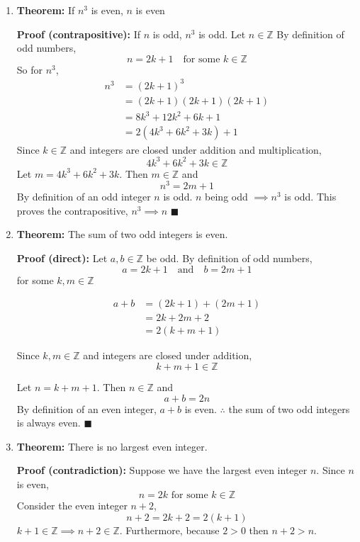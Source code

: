 \documentclass{article}
\begin{document}
\begin{enumerate}
  \item \textbf{Theorem:} If $n^{3}$ is even, $n$ is even

    \textbf{Proof (contrapositive):} If $n$ is odd, $n^{3}$ is odd. Let $n \in \mathbb{Z}$ By definition of odd numbers,
    \[
      n = 2k + 1 \quad\text{for some } k \in \mathbb{Z}
    \]
    So for $n^{3}$,
    \begin{align*}
      n^{3} &= (2k + 1)^{3} \\
            &= (2k + 1)(2k + 1)(2k + 1) \\
            &= 8k^{3} + 12k^{2} + 6k + 1 \\
            &= 2(4k^{3} + 6k^{2} + 3k) + 1
    \end{align*}
    Since $k \in \mathbb{Z}$ and integers are closed under addition and multiplication, 
    \[
      4k^{3} + 6k^{2} + 3k \in \mathbb{Z}
    \]
    Let $m = 4k^{3} + 6k^{2} + 3k$. Then $m \in \mathbb{Z}$ and
    \[
      n^{3} = 2m + 1
    \]
    By definition of an odd integer $n$ is odd. $n$ being odd $\implies n^{3}$ is odd. 
    This proves the contrapositive, $n^{3}\implies n$
    \hfill$\blacksquare$
    

  \item \textbf{Theorem:} The sum of two odd integers is even.

    \textbf{Proof (direct):}
    Let $a,b \in \mathbb{Z}$ be odd. By definition of odd numbers, 
    \[
      a = 2k + 1
      \quad\text{and}\quad
      b = 2m + 1
    \]
    for some $k,m \in \mathbb{Z}$

    \begin{align*}
      a + b
      &= (2k + 1) + (2m + 1) \\
      &= 2k + 2m + 2 \\
      &= 2(k + m + 1)
    \end{align*}

    Since $k,m \in \mathbb{Z}$ and integers are closed under addition, 
    \[
      k + m + 1 \in \mathbb{Z} 
    \]
     
    Let $n = k + m + 1$. Then $n \in \mathbb{Z}$ and
    \[
      a + b = 2n
    \]
    By definition of an even integer, $a + b$ is even. $\therefore$ the sum of two odd integers is always even.
    \hfill$\blacksquare$
   
  \item \textbf{Theorem:} There is no largest even integer.

    \textbf{Proof (contradiction):} Suppose we have the largest even integer $n$. Since $n$ is even,
    \[
      n = 2k \text{ for some } k \in \mathbb{Z}
    \]
    Consider the even integer $n + 2$,
    \[
      n + 2 = 2k + 2 = 2(k + 1)
    \]
    $k + 1 \in \mathbb{Z} \implies n + 2 \in \mathbb{Z}$. Furthermore, because $2 > 0$ then $n + 2 > n$. 
    

\end{enumerate}
\end{document}
